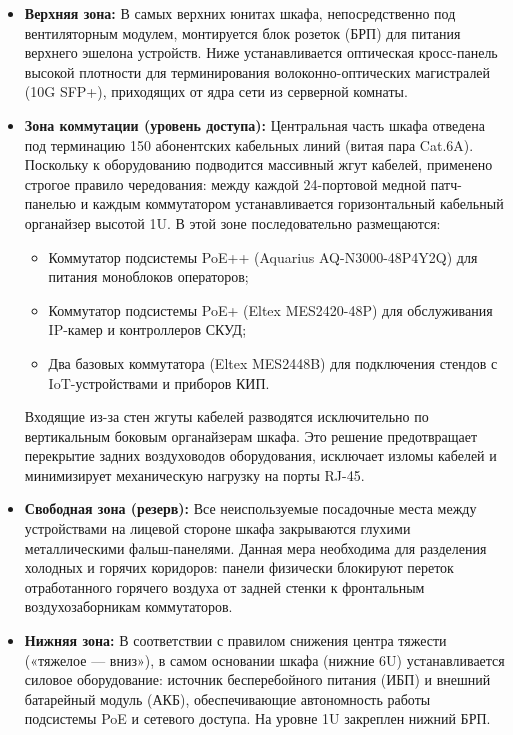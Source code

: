 \documentclass[a4paper,oneside,14pt]{extreport}
\begin{document}
\begin{itemize}
    \item \textbf{Верхняя зона:} В самых верхних юнитах шкафа, непосредственно под вентиляторным модулем, монтируется блок розеток (БРП) для питания верхнего эшелона устройств. Ниже устанавливается оптическая кросс-панель высокой плотности для терминирования волоконно-оптических магистралей (10G SFP+), приходящих от ядра сети из серверной комнаты.
    \item \textbf{Зона коммутации (уровень доступа):} Центральная часть шкафа отведена под терминацию 150 абонентских кабельных линий (витая пара Cat.6A). Поскольку к оборудованию подводится массивный жгут кабелей, применено строгое правило чередования: между каждой 24-портовой медной патч-панелью и каждым коммутатором устанавливается горизонтальный кабельный органайзер высотой 1U.
    В этой зоне последовательно размещаются:
    \begin{itemize}
        \item Коммутатор подсистемы PoE++ (Aquarius AQ-N3000-48P4Y2Q) для питания моноблоков операторов;
        \item Коммутатор подсистемы PoE+ (Eltex MES2420-48P) для обслуживания IP-камер и контроллеров СКУД;
        \item Два базовых коммутатора (Eltex MES2448B) для подключения стендов с IoT-устройствами и приборов КИП.
    \end{itemize}
    Входящие из-за стен жгуты кабелей разводятся исключительно по вертикальным боковым органайзерам шкафа. Это решение предотвращает перекрытие задних воздуховодов оборудования, исключает изломы кабелей и минимизирует механическую нагрузку на порты RJ-45.
    \item \textbf{Свободная зона (резерв):} Все неиспользуемые посадочные места между устройствами на лицевой стороне шкафа закрываются глухими металлическими фальш-панелями. Данная мера необходима для разделения холодных и горячих коридоров: панели физически блокируют переток отработанного горячего воздуха от задней стенки к фронтальным воздухозаборникам коммутаторов.
    \item \textbf{Нижняя зона:} В соответствии с правилом снижения центра тяжести («тяжелое --- вниз»), в самом основании шкафа (нижние 6U) устанавливается силовое оборудование: источник бесперебойного питания (ИБП) и внешний батарейный модуль (АКБ), обеспечивающие автономность работы подсистемы PoE и сетевого доступа. На уровне 1U закреплен нижний БРП.
\end{itemize}
\end{document}
